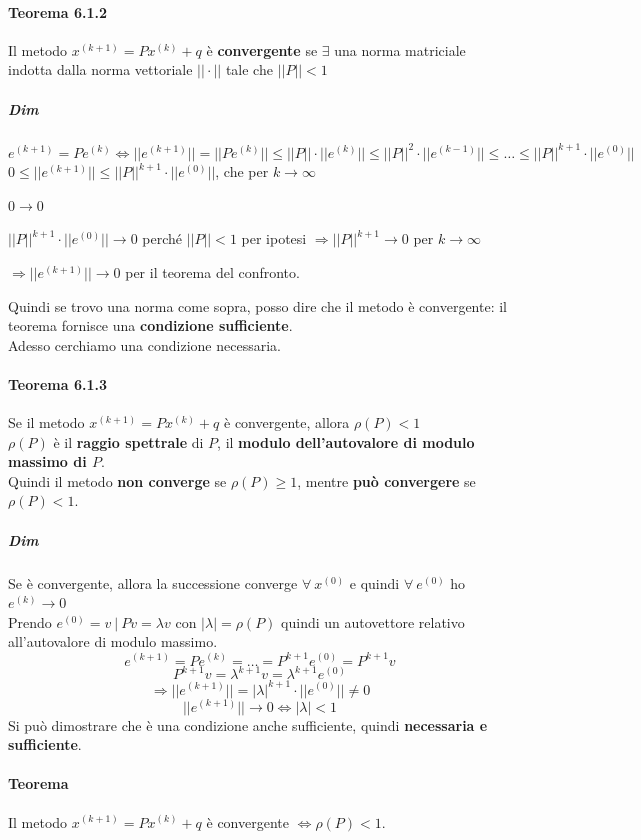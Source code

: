 \documentclass[10pt]{book}
\begin{document}
\paragraph{Teorema 6.1.2} Il metodo $x^{(k+1)} = Px^{(k)} + q$ è \textbf{convergente} se $\exists$ una norma matriciale indotta dalla norma vettoriale $||\cdot||$ tale che $||P|| < 1$
\subparagraph{Dim} $e^{(k + 1)} = Pe^{(k)} \Leftrightarrow ||e^{(k + 1)}|| = ||Pe^{(k)}|| \leq ||P||\cdot||e^{(k)}|| \leq ||P||^2\cdot||e^{(k-1)}|| \leq \ldots \leq ||P||^{k+1}\cdot||e^{(0)}||$\\
$0 \leq ||e^{(k+1)}|| \leq ||P||^{k+1}\cdot||e^{(0)}||$, che per $k\to\infty$
\begin{list}{}{}
	\item $0\to 0$
	\item $||P||^{k+1}\cdot||e^{(0)}||\to 0$ perché $||P|| < 1$ per ipotesi $\Rightarrow||P||^{k+1}\to 0$ per $k\to\infty$
	\item $\Rightarrow||e^{(k+1)}||\to 0$ per il teorema del confronto.
\end{list}
Quindi se trovo una norma come sopra, posso dire che il metodo è convergente: il teorema fornisce una \textbf{condizione sufficiente}.\\
Adesso cerchiamo una condizione necessaria.
\paragraph{Teorema 6.1.3} Se il metodo $x^{(k+1)} = Px^{(k)} + q$ è convergente, allora $\rho(P) < 1$\\
$\rho(P)$ è il \textbf{raggio spettrale} di $P$, il \textbf{modulo dell'autovalore di modulo massimo di $P$}.\\
Quindi il metodo \textbf{non converge} se $\rho(P) \geq 1$, mentre \textbf{può convergere} se $\rho(P) < 1$.
\subparagraph{Dim} Se è convergente, allora la successione converge $\forall\: x^{(0)}$ e quindi $\forall\:e^{(0)}$ ho $e^{(k)}\to 0$\\
Prendo $e^{(0)} = v\:|\: Pv = \lambda v$ con $|\lambda| = \rho(P)$ quindi un autovettore relativo all'autovalore di modulo massimo.
$$e^{(k+1)} = Pe^{(k)} = \ldots = P^{k+1}e^{(0)} = P^{k+1}v$$
$$P^{k+1}v = \lambda^{k+1}v = \lambda^{k+1}e^{(0)}$$
$$\Rightarrow||e^{(k+1)}|| = |\lambda|^{k+1}\cdot||e^{(0)}|| \neq 0$$
$$||e^{(k+1)}||\to 0 \Leftrightarrow |\lambda| < 1$$
Si può dimostrare che è una condizione anche sufficiente, quindi \textbf{necessaria e sufficiente}.
\paragraph{Teorema} Il metodo $x^{(k+1)} = Px^{(k)} + q$ è convergente $\Leftrightarrow \rho(P) < 1$.
\pagebreak
\end{document}
